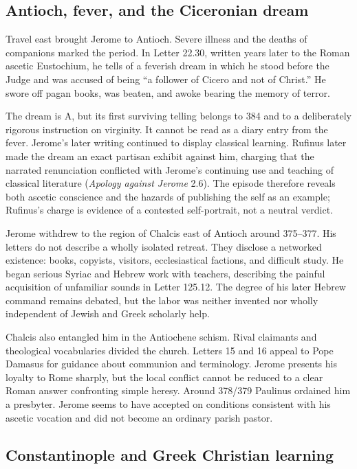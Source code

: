 \subsection{Antioch, fever, and the Ciceronian dream}

Travel east brought Jerome to Antioch. Severe illness and the deaths of
companions marked the period. In Letter 22.30, written years later to the Roman
ascetic Eustochium, he tells of a feverish dream in which he stood before the
Judge and was accused of being “a follower of Cicero and not of Christ.” He
swore off pagan books, was beaten, and awoke bearing the memory of terror.

The dream is A, but its first surviving telling belongs to 384 and to a
deliberately rigorous instruction on virginity. It cannot be read as a diary
entry from the fever. Jerome's later writing continued to display classical
learning. Rufinus later made the dream an exact partisan exhibit against him,
charging that the narrated renunciation conflicted with Jerome's continuing
use and teaching of classical literature (\emph{Apology against Jerome}
2.6). The episode therefore reveals both ascetic conscience and the hazards of
publishing the self as an example; Rufinus's charge is evidence of a contested
self-portrait, not a neutral verdict.

Jerome withdrew to the region of Chalcis east of Antioch around 375--377.
His letters do not describe a wholly isolated retreat. They disclose a
networked existence: books, copyists, visitors, ecclesiastical factions, and
difficult study. He began serious Syriac and Hebrew work with teachers,
describing the painful acquisition of unfamiliar sounds in Letter 125.12.
The degree of his later Hebrew command remains debated, but the labor was
neither invented nor wholly independent of Jewish and Greek scholarly help.

Chalcis also entangled him in the Antiochene schism. Rival claimants and
theological vocabularies divided the church. Letters 15 and 16 appeal to Pope
Damasus for guidance about communion and terminology. Jerome presents his
loyalty to Rome sharply, but the local conflict cannot be reduced to a clear
Roman answer confronting simple heresy. Around 378/379 Paulinus ordained him
a presbyter. Jerome seems to have accepted on conditions consistent with his
ascetic vocation and did not become an ordinary parish pastor.

\subsection{Constantinople and Greek Christian learning}


